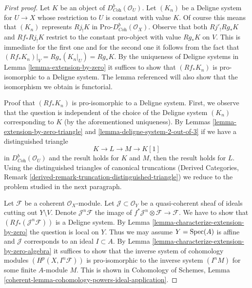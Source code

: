 \begin{proof}[First proof]
Let $K$ be an object of $D^b_{\textit{Coh}}(\mathcal{O}_U)$. Let $(K_n)$
be a Deligne system for $U \to X$ whose restriction to $U$ is constant
with value $K$. Of course this means that $(K_n)$ represents $Rj_!K$
in $\text{Pro-}D^b_{\textit{Coh}}(\mathcal{O}_X)$. Observe that
both $Rj'_!Rg_*K$ and $Rf_*Rj_!K$ restrict to the constant pro-object with
value $Rg_*K$ on $V$. This is immediate for the first one and for the second
one it follows from the fact that $(Rf_*K_n)|_V = Rg_*(K_n|_U) = Rg_*K$.
By the uniqueness of Deligne systems in Lemma \ref{lemma-extension-by-zero}
it suffices to show that $(Rf_*K_n)$ is pro-isomorphic to a
Deligne system. The lemma referenced will also show that the
isomorphism we obtain is functorial.

\medskip\noindent
Proof that $(Rf_*K_n)$ is pro-isomorphic to a Deligne system.
First, we observe that the question is independent of the choice
of the Deligne system $(K_n)$ corresponding to $K$ (by the aforementioned
uniqueness). By Lemmas \ref{lemma-extension-by-zero-triangle} and
\ref{lemma-deligne-system-2-out-of-3}
if we have a distinguished triangle
$$
K \to L \to M \to K[1]
$$
in $D^b_{\textit{Coh}}(\mathcal{O}_U)$ and the result holds for
$K$ and $M$, then the result holds for $L$. Using the distinguished
triangles of canonical truncations (Derived Categories, Remark
\ref{derived-remark-truncation-distinguished-triangle})
we reduce to the problem studied in the next paragraph.

\medskip\noindent
Let $\mathcal{F}$ be a coherent $\mathcal{O}_X$-module.
Let $\mathcal{J} \subset \mathcal{O}_Y$ be a quasi-coherent
sheaf of ideals cutting out $Y \setminus V$. Denote
$\mathcal{J}^n\mathcal{F}$ the image of
$f^*\mathcal{J}^n \otimes \mathcal{F} \to \mathcal{F}$.
We have to show that $(Rf_*(\mathcal{J}^n\mathcal{F}))$
is a Deligne system. By Lemma \ref{lemma-characterize-extension-by-zero}
the question is local on $Y$. Thus we may assume $Y = \mathop{\mathrm{Spec}}(A)$ is affine
and $\mathcal{J}$ corresponds to an ideal $I \subset A$. By
Lemma \ref{lemma-characterize-extension-by-zero-algebra}
it suffices to show that the inverse system of cohomology modules
$(H^p(X, I^n\mathcal{F}))$ is pro-isomorphic to the inverse system
$(I^n M)$ for some finite $A$-module $M$.
This is shown in Cohomology of Schemes, Lemma
\ref{coherent-lemma-cohomology-powers-ideal-application}.
\end{proof}


